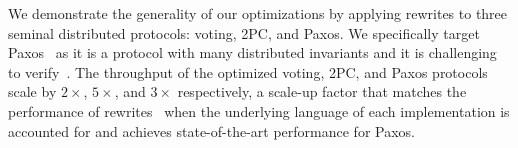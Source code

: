 
We demonstrate the generality of our optimizations by  applying rewrites to three seminal distributed protocols: voting, 2PC, and Paxos.
We specifically target Paxos~\cite{paxosComplex} as it is a protocol with many distributed invariants and it is challenging to verify~\cite{verdi,ironfleet,distai}.
The throughput of the optimized voting, 2PC, and Paxos protocols scale by $2\times$, $5\times$, and $3\times$ respectively, a scale-up factor that matches the performance of  rewrites~\cite{compartmentalized} when the underlying language of each implementation is accounted for and achieves state-of-the-art performance for Paxos.

